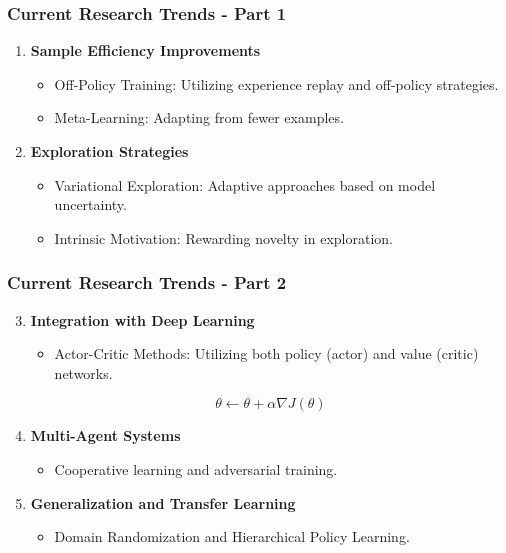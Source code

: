 \documentclass{beamer}
\begin{document}
\begin{frame}[fragile]
    \frametitle{Current Research Trends - Part 1}
    \begin{enumerate}
        \item \textbf{Sample Efficiency Improvements}
        \begin{itemize}
            \item Off-Policy Training: Utilizing experience replay and off-policy strategies.
            \item Meta-Learning: Adapting from fewer examples.
        \end{itemize}
        \item \textbf{Exploration Strategies}
        \begin{itemize}
            \item Variational Exploration: Adaptive approaches based on model uncertainty.
            \item Intrinsic Motivation: Rewarding novelty in exploration.
        \end{itemize}
    \end{enumerate}
\end{frame}

\begin{frame}[fragile]
    \frametitle{Current Research Trends - Part 2}
    \begin{enumerate}
        \setcounter{enumi}{2} %
        \item \textbf{Integration with Deep Learning}
        \begin{itemize}
            \item Actor-Critic Methods: Utilizing both policy (actor) and value (critic) networks.
        \end{itemize}
        \begin{equation}
            \theta \leftarrow \theta + \alpha \nabla J(\theta)
        \end{equation}
        \item \textbf{Multi-Agent Systems}
        \begin{itemize}
            \item Cooperative learning and adversarial training.
        \end{itemize}
        \item \textbf{Generalization and Transfer Learning}
        \begin{itemize}
            \item Domain Randomization and Hierarchical Policy Learning.
        \end{itemize}
    \end{enumerate}
\end{frame}
\end{document}
